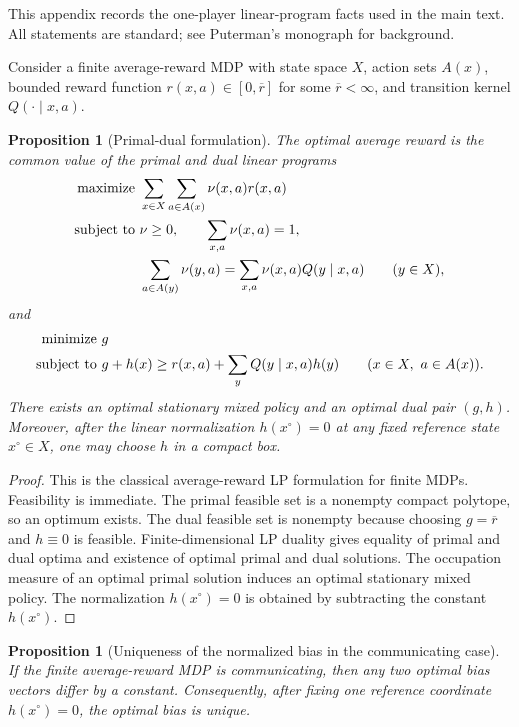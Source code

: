 \documentclass[12pt]{article}
\newtheorem{proposition}[theorem]{Proposition}
\theoremstyle{definition}
\newcommand{\1}{\mathbf{1}}
\begin{document}
This appendix records the one-player linear-program facts used in the main text.
All statements are standard; see Puterman's monograph \cite{Puterman1994} for
background.

Consider a finite average-reward MDP with state space $X$, action sets $A(x)$,
bounded reward function $r(x,a)\in[0,\overline r]$ for some $\overline r<\infty$,
and transition kernel $Q(\cdot\mid x,a)$.

\begin{proposition}[Primal-dual formulation]
\label{prop:mdp-duality}
The optimal average reward is the common value of the primal and dual linear
programs
\begin{align*}
\textnormal{maximize }&\sum_{x\in X}\sum_{a\in A(x)}\nu(x,a)r(x,a)
\\
\textnormal{subject to }&\nu\ge 0,
\qquad \sum_{x,a}\nu(x,a)=1,
\\
&\sum_{a\in A(y)}\nu(y,a)=\sum_{x,a}\nu(x,a)Q(y\mid x,a)
\qquad (y\in X),
\end{align*}
and
\begin{align*}
\textnormal{minimize }&g
\\
\textnormal{subject to }&g+h(x)\ge r(x,a)+\sum_y Q(y\mid x,a)h(y)
\qquad (x\in X,\ a\in A(x)).
\end{align*}
There exists an optimal stationary mixed policy and an optimal dual pair $(g,h)$.
Moreover, after the linear normalization $h(x^\circ)=0$ at any fixed reference
state $x^\circ\in X$, one may choose $h$ in a compact box.
\end{proposition}

\begin{proof}
This is the classical average-reward LP formulation for finite MDPs. Feasibility is
immediate. The primal feasible set is a nonempty compact polytope, so an optimum
exists. The dual feasible set is nonempty because choosing $g=\overline r$ and
$h\equiv 0$ is feasible. Finite-dimensional LP duality gives equality of primal
and dual
optima and existence of optimal primal and dual solutions. The occupation measure
of an optimal primal solution induces an optimal stationary mixed policy. The
normalization $h(x^\circ)=0$ is obtained by subtracting the constant $h(x^\circ)$.
\end{proof}

\begin{proposition}[Uniqueness of the normalized bias in the communicating case]
\label{prop:bias-unique}
If the finite average-reward MDP is communicating, then any two optimal bias
vectors differ by a constant. Consequently, after fixing one reference coordinate
$h(x^\circ)=0$, the optimal bias is unique.
\end{proposition}
\end{document}
